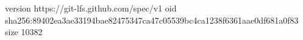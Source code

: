 version https://git-lfs.github.com/spec/v1
oid sha256:89402ea3ae33194bae82475347ca47c05539bc4ca1238f6361aae0df681a0f83
size 10382
